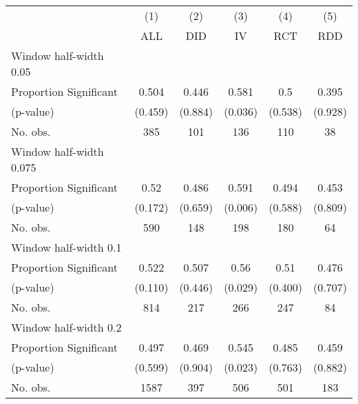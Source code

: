 
\def\sym#1{\ifmmode^{#1}\else\(^{#1}\)\fi}
\begin{tabular}{l*{5}{c}}
\hline\hline
& \multicolumn{1}{c}{(1)} &  \multicolumn{1}{c}{(2)} &  \multicolumn{1}{c}{(3)} &  \multicolumn{1}{c}{(4)} &  \multicolumn{1}{c}{(5)}\\
& \multicolumn{1}{c}{ALL} &  \multicolumn{1}{c}{DID} &  \multicolumn{1}{c}{IV} &  \multicolumn{1}{c}{RCT} &  \multicolumn{1}{c}{RDD}\\

\hline
\hline
Window half-width 0.05\\

Proportion Significant& 0.504 &  0.446 &  0.581 &  0.5 &  0.395\\

(p-value) & (0.459) &  (0.884) &  (0.036) &  (0.538) &  (0.928)\\

No. obs.& 385 &  101 &  136 &  110 &  38\\

\hline
Window half-width 0.075\\

Proportion Significant& 0.52 &  0.486 &  0.591 &  0.494 &  0.453\\

(p-value) & (0.172) &  (0.659) &  (0.006) &  (0.588) &  (0.809)\\

No. obs.& 590 &  148 &  198 &  180 &  64\\

\hline
Window half-width 0.1\\

Proportion Significant& 0.522 &  0.507 &  0.56 &  0.51 &  0.476\\

(p-value) & (0.110) &  (0.446) &  (0.029) &  (0.400) &  (0.707)\\

No. obs.& 814 &  217 &  266 &  247 &  84\\

\hline
Window half-width 0.2\\

Proportion Significant& 0.497 &  0.469 &  0.545 &  0.485 &  0.459\\

(p-value) & (0.599) &  (0.904) &  (0.023) &  (0.763) &  (0.882)\\

No. obs.& 1587 &  397 &  506 &  501 &  183\\


\end{tabular}
